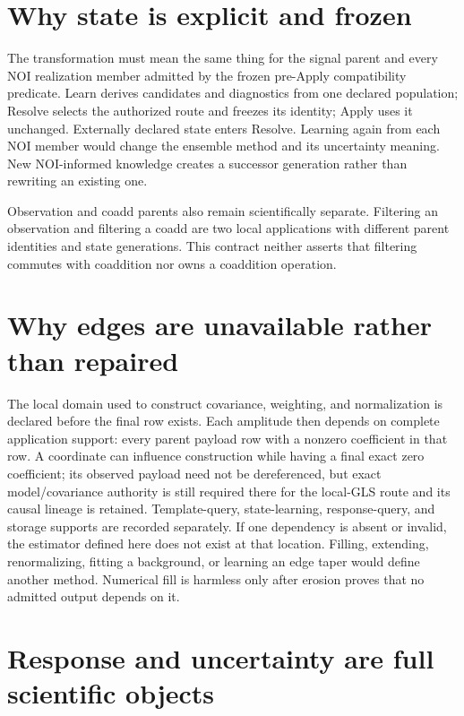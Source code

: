 \documentclass[11pt]{article}
\begin{document}
\section{Why state is explicit and frozen}

The transformation must mean the same thing for the signal parent and every
NOI realization member admitted by the frozen pre-Apply compatibility
predicate. Learn derives candidates and diagnostics
from one declared population; Resolve selects the authorized route and freezes
its identity; Apply uses it unchanged. Externally declared state enters
Resolve. Learning again from each NOI member would change the ensemble method
and its uncertainty meaning. New NOI-informed knowledge creates a successor
generation rather than rewriting an existing one.

Observation and coadd parents also remain scientifically separate. Filtering
an observation and filtering a coadd are two local applications with different
parent identities and state generations. This contract neither asserts that
filtering commutes with coaddition nor owns a coaddition operation.

\section{Why edges are unavailable rather than repaired}

The local domain used to construct covariance, weighting, and normalization is
declared before the final row exists. Each amplitude then depends on complete
application support: every parent payload row with a nonzero coefficient in
that row. A coordinate can influence construction while having a final exact
zero coefficient; its observed payload need not be dereferenced, but exact
model/covariance authority is still required there for the local-GLS route and
its causal lineage is retained. Template-query,
state-learning, response-query, and storage supports are recorded separately.
If one dependency is absent or invalid, the estimator defined here does not
exist at that location. Filling, extending, renormalizing, fitting a background,
or learning an edge taper would define another method. Numerical fill is
harmless only after erosion proves that no admitted output depends on it.

\section{Response and uncertainty are full scientific objects}
\end{document}
